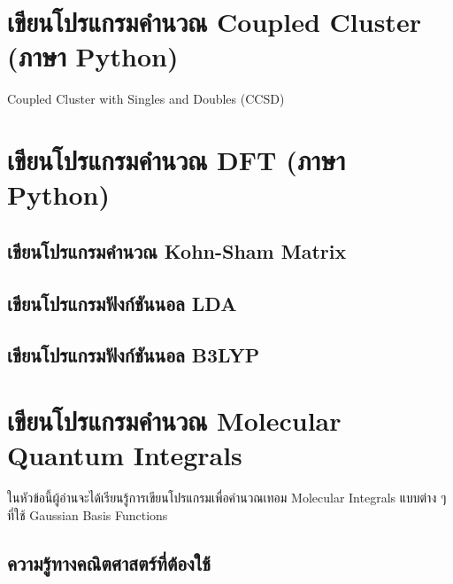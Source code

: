 \section{เขียนโปรแกรมคำนวณ Coupled Cluster (ภาษา Python)}

Coupled Cluster with Singles and Doubles (CCSD)

\section{เขียนโปรแกรมคำนวณ DFT (ภาษา Python)}

\subsection{เขียนโปรแกรมคำนวณ Kohn-Sham Matrix}

\subsection{เขียนโปรแกรมฟังก์ชันนอล LDA}

\subsection{เขียนโปรแกรมฟังก์ชันนอล B3LYP}

\section{เขียนโปรแกรมคำนวณ Molecular Quantum Integrals }

ในหัวข้อนี้ผู้อ่านจะได้เรียนรู้การเขียนโปรแกรมเพื่อคำนวณเทอม Molecular Integrals แบบต่าง ๆ ที่ใช้ Gaussian Basis Functions

\subsection{ความรู้ทางคณิตศาสตร์ที่ต้องใช้}


